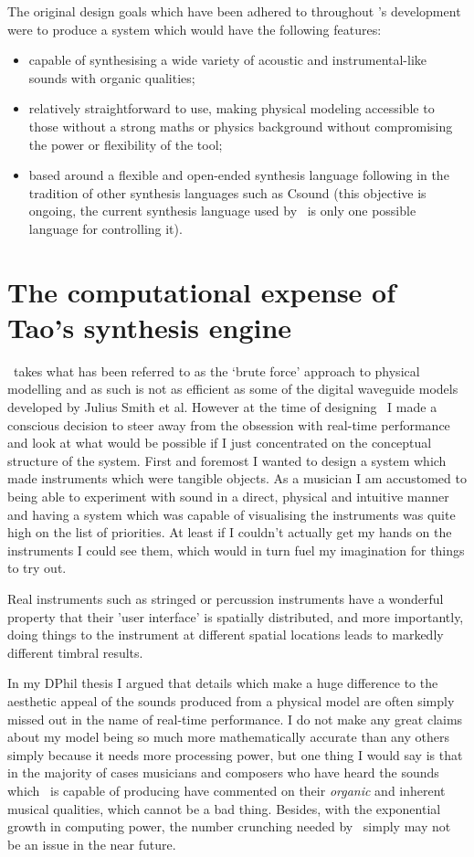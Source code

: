 The original design goals which have been adhered to throughout \tao's
development were to produce a system which would have the following
features:

\begin{itemize}
\item capable of synthesising a wide variety of acoustic and
instrumental-like sounds with organic qualities;
\item relatively straightforward to use, making physical modeling accessible
to those without a strong maths or physics background without compromising
the power or flexibility of the tool;
\item based around a flexible and open-ended synthesis language following
in the tradition of other synthesis languages such as Csound (this objective
is ongoing, the current synthesis language used by \tao\ is only one possible
language for controlling it).
\end{itemize}

\section{The computational expense of Tao's synthesis engine}
\tao\ takes what has been referred to as the `brute force' approach to physical
modelling and as such is not as efficient as some of the digital waveguide
models developed by Julius Smith et al. However at the time of designing \tao\
I made a conscious decision to steer away from the obsession with real-time
performance and look at what would be possible if I just concentrated on the
conceptual structure of the system. First and foremost I wanted to design
a system which made instruments which were tangible objects. As a musician
I am accustomed to being able to experiment with sound in a direct,
physical and intuitive manner and having a system which was capable
of visualising the instruments was quite high on the list of priorities.
At least if I couldn't actually get my hands on the instruments I could
see them, which would in turn fuel my imagination for things to try out.

Real instruments such as stringed or percussion instruments have a wonderful
property that their 'user interface' is spatially distributed, and more
importantly, doing things to the instrument at different spatial locations
leads to markedly different timbral results.

In my DPhil thesis I argued that details which make a huge difference to the
aesthetic appeal of the sounds produced from a physical model are often simply
missed out in the name of real-time performance. I do not make any great
claims about my model being so much more mathematically accurate than any
others simply because it needs more processing power, but one
thing I would say is that in the majority of cases musicians and composers
who have heard the sounds which \tao\ is capable of producing have commented
on their \emph{organic} and inherent musical qualities, which cannot be a bad
thing. Besides, with the exponential growth in computing power, the number
crunching needed by \tao\ simply may not be an issue in the near future.


